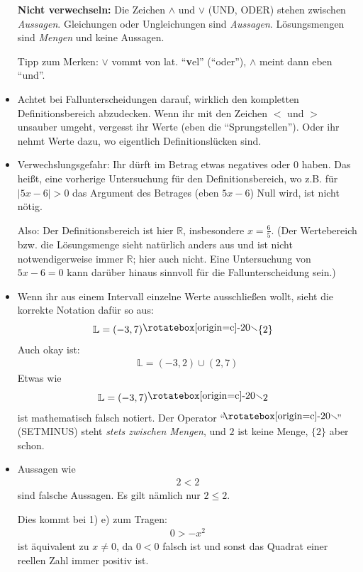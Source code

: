\documentclass[11pt, a4paper]{article}
\newcommand{\Lsg}{\mathbb{L}}
\newcommand{\R}{\mathbb{R}}
\newcommand\rsetminus{\mathbin{\mathpalette\rsetminusaux\relax}}
\newcommand\rsetminusaux[2]{\mspace{-4mu}
  \raisebox{\rsmraise{#1}\depth}{\rotatebox[origin=c]{-20}{$#1\smallsetminus$}}
 \mspace{-4mu}
}
\newcommand\rsmraise[1]{%
  \ifx#1\displaystyle .8\else
    \ifx#1\textstyle .8\else
      \ifx#1\scriptstyle .6\else
        .45%
      \fi
    \fi
  \fi}
\begin{document}
\begin{itemize}
\textbf{Nicht verwechseln:} Die Zeichen $\land$ und $\lor$ (UND, ODER) stehen zwischen \emph{Aussagen}. Gleichungen oder Ungleichungen sind \emph{Aussagen}. Lösungsmengen sind \emph{Mengen} und keine Aussagen. 

Tipp zum Merken: $\lor$ vommt von lat. \enquote{\textbf{v}el} (\enquote{oder}), $\land$ meint dann eben \enquote{und}.

\item Achtet bei Fallunterscheidungen darauf, wirklich den kompletten Definitionsbereich abzudecken. Wenn ihr mit den Zeichen $<$ und $>$ unsauber umgeht, vergesst ihr Werte (eben die \enquote{Sprungstellen}). Oder ihr nehmt Werte dazu, wo eigentlich Definitionslücken sind.

\item Verwechslungsgefahr: Ihr dürft im Betrag etwas negatives oder 0 haben. Das heißt, eine vorherige Untersuchung für den Definitionsbereich, wo z.B. für $|5x - 6| > 0$ das Argument des Betrages (eben $5x - 6$) Null wird, ist nicht nötig.

Also: Der Definitionsbereich ist hier $\R$, insbesondere $x = \frac{6}{5}$. (Der Wertebereich bzw. die Lösungsmenge sieht natürlich anders aus und ist nicht notwendigerweise immer $\R$; hier auch nicht. Eine Untersuchung von $5x - 6 = 0$ kann darüber hinaus sinnvoll für die Fallunterscheidung sein.) 

\item Wenn ihr aus einem Intervall einzelne Werte ausschließen wollt, sieht die korrekte Notation dafür so aus:
\begin{align*}
\Lsg &= (-3,7) \rsetminus \{2\}
\end{align*}
Auch okay ist:
\begin{align*}
 \Lsg  = (-3,2) \cup (2,7)
\end{align*}
Etwas wie 
\begin{align*}
\Lsg &= (-3,7) \rsetminus 2
\end{align*}
ist mathematisch falsch notiert. Der Operator \enquote{$\rsetminus$} (SETMINUS) steht \emph{stets zwischen Mengen}, und $2$ ist keine Menge, $\{2\}$ aber schon. 

\item Aussagen wie
\begin{align*}
 2 < 2
\end{align*}
sind falsche Aussagen. Es gilt nämlich nur $2 \leq 2$.

Dies kommt bei 1) e) zum Tragen:
\begin{align*}
 0 > -x^2
\end{align*}
ist äquivalent zu $x \neq 0$, da $0 < 0$ falsch ist und sonst das Quadrat einer reellen Zahl immer positiv ist.


\end{itemize}
\end{document}
